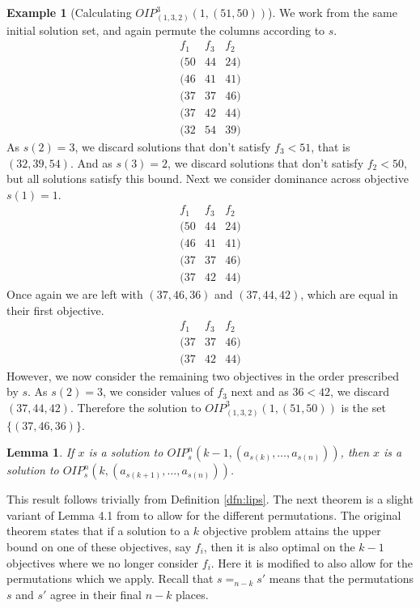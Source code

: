 \documentclass{amsart}
\newtheorem{lemma}{Lemma}
\theoremstyle{definition}
\newtheorem{example}{Example}
\begin{document}
\begin{example}[Calculating ${O\!I\!P}^3_{(1,3,2)}(1, (51, 50))$]\label{ex:lips2}
  We work from the same initial solution set, and again permute the columns according to $s$.
\[
\begin{array}{ccc}
  f_1 & f_3 & f_2 \\ \hline
  (50 & 44 & 24) \\
  (46 & 41 & 41) \\
  (37 & 37 & 46) \\
  (37 & 42 & 44) \\
  (32 & 54 & 39)
\end{array}
\]
  As $s(2) = 3$, we discard solutions that don't satisfy $f_3 < 51$, that is $(32, 39, 54)$.
  And as $s(3) = 2$, we discard solutions that don't satisfy $f_2 < 50$, but all solutions satisfy this bound.
  Next we consider dominance across objective $s(1) = 1$.
\[
\begin{array}{c|cc}
  f_1 & f_3 & f_2 \\ \hline
  (50 & 44 & 24) \\
  (46 & 41 & 41) \\
  (37 & 37 & 46) \\
  (37 & 42 & 44)
\end{array}
\]
  Once again we are left with $(37, 46, 36)$ and $(37, 44, 42)$, which are equal in their first objective.
\[
\begin{array}{c|cc}
  f_1 & f_3 & f_2 \\ \hline
  (37 & 37 & 46) \\
  (37 & 42 & 44)
\end{array}
\]
  However, we now consider the remaining two objectives in the order prescribed by $s$.
  As $s(2) = 3$, we consider values of $f_3$ next and as $36 < 42$, we discard $(37, 44, 42)$.
  Therefore the solution to ${O\!I\!P}^3_{(1,3,2)}(1, (51, 50))$ is the set $\{ (37, 46, 36) \}$.
\end{example}

\begin{lemma}\label{lemma:drop-k}
  If $x$ is a solution to ${O\!I\!P}^n_s(k-1, (a_{s(k)},\dots,a_{s(n)}))$,
  then $x$ is a solution to ${O\!I\!P}^n_s(k, (a_{s(k+1)},\allowbreak \dots,a_{s(n)}))$.
\end{lemma}

This result follows trivially from Definition \ref{dfn:lips}.
The next theorem is a slight variant of Lemma 4.1 from \cite{Ozlen2009GeneralApproach} to allow for the different permutations.
The original theorem states that if a solution to a $k$ objective problem attains the upper bound on one of these objectives, say $f_i$, then it is also optimal on the $k-1$ objectives where we no longer consider $f_i$.
Here it is modified to also allow for the permutations which we apply.
Recall that $s =_{n-k} s'$ means that the permutations $s$ and $s'$ agree in their final $n-k$ places.
\end{document}
